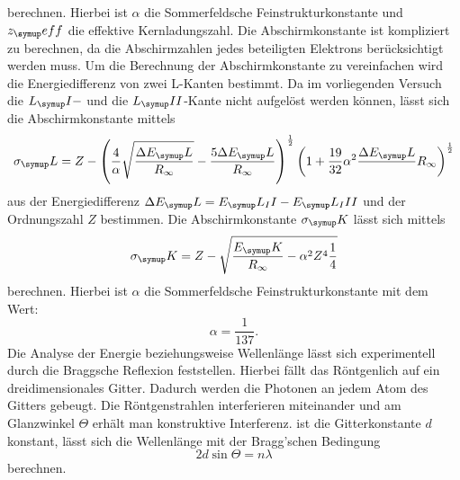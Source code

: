 berechnen. Hierbei ist $\alpha$ die Sommerfeldsche Feinstrukturkonstante und
$z_\su{eff}$ die effektive Kernladungszahl.
Die Abschirmkonstante ist kompliziert zu berechnen, da die Abschirmzahlen
jedes beteiligten Elektrons berücksichtigt werden muss. Um die Berechnung der
Abschirmkonstante zu vereinfachen wird die Energiedifferenz von zwei L-Kanten
bestimmt.
Da im vorliegenden Versuch die $L_\su{I}-$ und die $L_\su{II}$-Kante nicht
aufgelöst werden können, lässt sich die Abschirmkonstante mittels
\begin{equation}
  \sigma_\su{L}=Z-\left(\frac{4}{\alpha}\sqrt{\frac{\Delta E_\su{L}}{R_\infty}
  }-\frac{5\Delta E_\su{L}}{R_\infty}\right)^{\frac{1}{2}}\left(1+\frac{19}{32}
  \alpha^2\frac{\Delta E_\su{L}}{}R_\infty\right)^{\frac{1}{2}}
  \label{eqn:abschirmL}
\end{equation}
aus der Energiedifferenz $\Delta E_\su{L}=E_\su{L_II}-E_\su{L_III}$ und der
Ordnungszahl $Z$ bestimmen.
Die Abschirmkonstante $\sigma_\su{K}$ lässt sich mittels
\begin{equation}
  \sigma_\su{K}=Z-\sqrt{\frac{E_\su{K}}{R_\infty}-\alpha^2Z^4\frac{1}{4}}
  \label{eqn:abschirmK}
\end{equation}
berechnen. Hierbei ist $\alpha$ die Sommerfeldsche Feinstrukturkonstante mit
dem Wert:
\begin{equation}
  \alpha = \frac{1}{137}.
\end{equation} 
Die Analyse der Energie beziehungsweise Wellenlänge
lässt sich experimentell durch die Braggsche Reflexion feststellen. Hierbei
fällt das Röntgenlich auf ein dreidimensionales Gitter. Dadurch werden die
Photonen an jedem Atom des Gitters gebeugt. Die Röntgenstrahlen interferieren
miteinander und am Glanzwinkel $\Theta$ erhält man konstruktive Interferenz.
ist die Gitterkonstante $d$ konstant, lässt sich die Wellenlänge mit der
Bragg'schen Bedingung
\begin{equation}
  2d\sin\Theta=n\lambda
  \label{eqn:bragg}
\end{equation}
berechnen.
